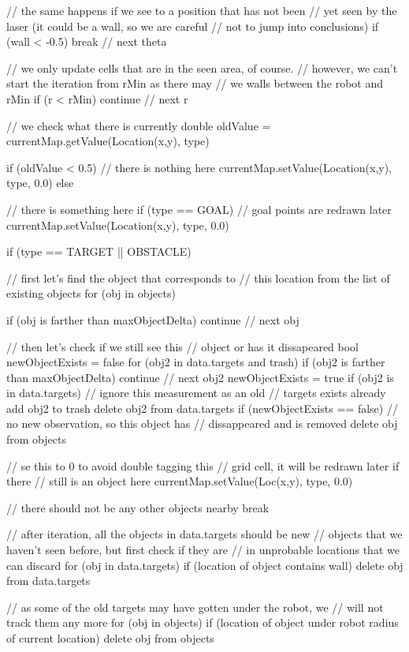 \documentclass[a4paper,10pt]{article}
\begin{document}
\begin{appendices}
\begin{verbatimtab}
{	// the same happens if we see to a position that has not been 
	// yet seen by the laser (it could be a wall, so we are careful
	// not to jump into conclusions)
	if (wall < -0.5) {
		break // next theta
	}
	
	// we only update cells that are in the seen area, of course. 
	// however, we can't start the iteration from rMin as there may
	// we walls between the robot and rMin
	if (r < rMin) {
		continue // next r
	} 
	
	// we check what there is currently
	double oldValue = currentMap.getValue(Location(x,y), type)
	
	if (oldValue < 0.5) {
		// there is nothing here
		currentMap.setValue(Location(x,y), type, 0.0)
	}
	else {
		// there is something here
		if (type == GOAL) {
			// goal points are redrawn later
			currentMap.setValue(Location(x,y), type, 0.0)
		}
		
		if (type == TARGET || OBSTACLE) {
			// first let's find the object that corresponds to 
			// this location from the list of existing objects
			for (obj in objects) {
				if (obj is farther than maxObjectDelta) {
					continue // next obj
				}
				
				// then let's check if we still see this 
				// object or has it dissapeared
				bool newObjectExists = false
				for (obj2 in data.targets and trash) {
					if (obj2 is farther than maxObjectDelta) {
						continue // next obj2
					}
					newObjectExists = true
					if (obj2 is in data.targets) {
						// ignore this measurement as an old 
						// targets exists already
						add obj2 to trash
						delete obj2 from data.targets
					}
				}
				if (newObjectExists == false) {
					// no new observation, so this object has 
					// dissappeared and is removed
					delete obj from objects
				}
				
				// se this to 0 to avoid double tagging this 
				// grid cell, it will be redrawn later if there 
				// still is an object here
				currentMap.setValue(Loc(x,y), type, 0.0)
				
				// there should not be any other objects nearby
				break
			}
		}
	}
}

// after iteration, all the objects in data.targets should be new
// objects that we haven't seen before, but first check if they are
// in unprobable locations that we can discard
for (obj in data.targets) {
	if (location of object contains wall) {
		delete obj from data.targets
	}
}

// as some of the old targets may have gotten under the robot, we 
// will not track them any more
for (obj in objects) {
	if (location of object under robot radius of current location) {
		delete obj from objects
	} 
}


\end{verbatimtab}
\end{appendices}
\end{document}

